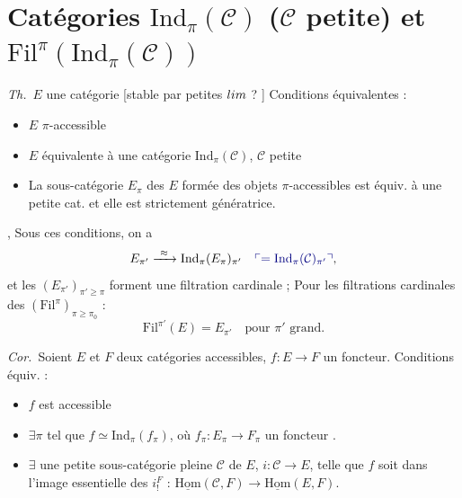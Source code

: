 \documentclass[11pt,a4paper]{article}
\begin{document}

\section*{Catégories $\mathrm{Ind}_{\pi}(\mathcal{C})$ ($\mathcal{C}$
petite) et $\mathrm{Fil}^{\pi}(\mathrm{Ind}_{\pi}(\mathcal{C}))$}

\emph{Th.}\ $E$ une catégorie [stable par petites $\varinjlim$ ?
] Conditions
équivalentes :
\begin{itemize}
  \item[a)] $E$ $\pi$-accessible
  \item[b)] $E$ équivalente à une catégorie $\mathrm{Ind}_{\pi}(\mathcal{C})$,
    $\mathcal{C}$ petite
  \item[c)] La sous-catégorie $E_{\pi}$ des $E$ formée des objets
    $\pi$-accessibles est équiv. à une petite cat. et elle est strictement
    génératrice.
\end{itemize}
, Sous ces conditions, \struck{\ill{}}
on a
\[
  E_{\pi'} \xrightarrow{\ \approx\ } \mathrm{Ind}_{\pi}(E_{\pi})_{\pi'}
  \quad \add{= \mathrm{Ind}_{\pi}(\mathcal{C})_{\pi'}},
\]
et les $(E_{\pi'})_{\pi' \geqslant \pi}$ forment une filtration cardinale ;
\struck{\ill{}} Pour les filtrations cardinales des
$(\mathrm{Fil}^{\pi})_{\pi \geqslant \pi_{0}}$ \ill{} :
\[
  \mathrm{Fil}^{\pi'}(E) = E_{\pi'} \quad \text{pour } \pi' \text{ grand.}
\]

\emph{Cor.}\ Soient $E$ et $F$ deux catégories accessibles,
 $f : E \to F$ un foncteur.  Conditions
équiv. :
\begin{itemize}
  \item[a)] $f$ est \struck{$\pi$-}accessible
  \item[b)] $\exists \pi$ tel que $f \simeq \mathrm{Ind}_{\pi}(f_{\pi})$, où
    $f_{\pi} : E_{\pi} \to F_{\pi}$ un foncteur . 
  \item[c)] $\exists$ une petite sous-catégorie pleine $\mathcal{C}$ de $E$,
    $i : \mathcal{C} \to E$, telle que $f$ soit dans l'image essentielle des
    $i^{F}_{!}$ : $\underline{\mathrm{Hom}}(\mathcal{C}, F) \to
    \underline{\mathrm{Hom}}(E, F)$.
\end{itemize}
\end{document}
